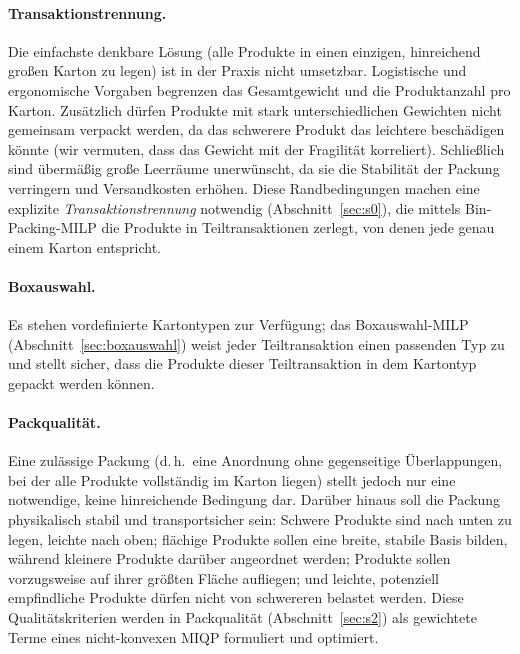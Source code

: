 \documentclass[10pt]{article}
\begin{document}
\paragraph{Transaktionstrennung.}
Die einfachste denkbare L\"osung (alle Produkte in einen einzigen,
hinreichend gro\ss en Karton zu legen) ist in der Praxis nicht
umsetzbar.
Logistische und ergonomische Vorgaben begrenzen das Gesamtgewicht und
die Produktanzahl pro Karton.
Zus\"atzlich d\"urfen Produkte mit stark unterschiedlichen Gewichten
nicht gemeinsam verpackt werden, da das schwerere Produkt das
leichtere besch\"adigen k\"onnte (wir vermuten, dass das Gewicht mit der Fragilit\"at korreliert).
Schlie\ss lich sind \"uberm\"a\ss ig gro\ss e Leerr\"aume unerw\"unscht,
da sie die Stabilit\"at der Packung verringern und Versandkosten
erh\"ohen.
Diese Randbedingungen machen eine explizite \emph{Transaktionstrennung}
notwendig (Abschnitt~\ref{sec:s0}), die mittels
Bin-Packing-MILP die Produkte in Teiltransaktionen zerlegt, von denen
jede genau einem Karton entspricht.

\paragraph{Boxauswahl.}
Es stehen vordefinierte Kartontypen zur Verfügung; das Boxauswahl-MILP (Abschnitt~\ref{sec:boxauswahl}) weist jeder Teiltransaktion einen passenden Typ zu und stellt sicher, dass die Produkte dieser Teiltransaktion in dem Kartontyp gepackt werden können.

\paragraph{Packqualit\"at.}
Eine zul\"assige Packung (d.\,h.\ eine Anordnung ohne gegenseitige
\"Uberlappungen, bei der alle Produkte vollst\"andig im Karton liegen) 
stellt jedoch nur eine notwendige, keine hinreichende Bedingung dar.
Dar\"uber hinaus soll die Packung physikalisch stabil und transportsicher
sein: Schwere Produkte sind nach unten zu legen, leichte nach oben;
fl\"achige Produkte sollen eine breite, stabile Basis bilden, w\"ahrend
kleinere Produkte dar\"uber angeordnet werden; Produkte sollen vorzugsweise
auf ihrer gr\"o\ss ten Fl\"ache aufliegen; und leichte, potenziell
empfindliche Produkte d\"urfen nicht von schwereren belastet werden.
Diese Qualit\"atskriterien werden in Packqualit\"at (Abschnitt~\ref{sec:s2})
als gewichtete Terme eines nicht-konvexen MIQP formuliert und optimiert.
\end{document}
